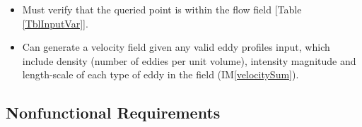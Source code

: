 \documentclass[12pt]{article}
\newcommand{\iref}[1]{IM\ref{#1}}
\newcounter{reqnum} %
\begin{document}
\noindent \begin{itemize}

\item[R\refstepcounter{reqnum}\thereqnum \label{R_inputs}:] Must verify that the queried point is within the flow field [Table \ref{TblInputVar}].


\item[R\refstepcounter{reqnum}\thereqnum \label{R_anyEddy}:] Can generate a velocity field given any valid eddy profiles input, which include density (number of eddies per unit volume), intensity magnitude and length-scale of each type of eddy in the field (\iref{velocitySum}).



\end{itemize}


\subsection{Nonfunctional Requirements}

\end{document}
